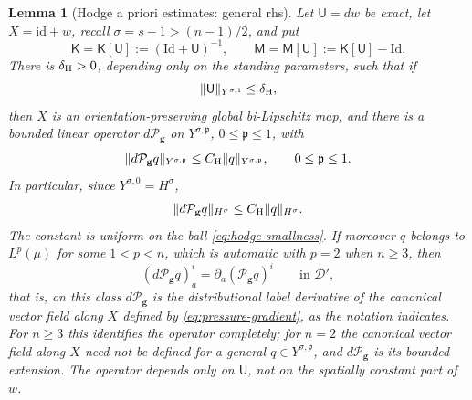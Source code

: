 \documentclass[11pt,reqno]{amsart}
\theoremstyle{plain}
\newtheorem{lemma}[theorem]{Lemma}
\theoremstyle{definition}
\theoremstyle{remark}
\numberwithin{equation}{section}
\newcommand{\preg}{\mathfrak p}
\newcommand{\Ufield}{\mathsf U}
\newcommand{\Kmat}{\mathsf K}
\newcommand{\Mmat}{\mathsf M}
\newcommand{\gmetric}{\mathbf g}
\begin{document}
\begin{lemma}[Hodge a priori estimates: general rhs]\label{lem:label-hodge}
Let $\Ufield=dw$ be exact, let $X=\mathrm{id}+w$, recall $\sigma=s-1>(n-1)/2$,
and put
\begin{equation}\label{eq:KMdef}
    \Kmat=\Kmat[\Ufield]:=(\mathrm{Id}+\Ufield)^{-1},\qquad
    \Mmat=\Mmat[\Ufield]:=\Kmat[\Ufield]-\mathrm{Id}.
\end{equation}
There is $\delta_{\rm H}>0$, depending only on the standing parameters, such that if
\begin{equation}\label{eq:hodge-smallness}
 \|\Ufield\|_{Y^{\sigma,1}}\le\delta_{\rm H},
\end{equation}
then $X$ is an orientation-preserving global bi-Lipschitz map, and there is a
bounded linear operator $d\mathcal P_{\gmetric}$ on $Y^{\sigma,\preg}$,
$0\le\preg\le1$, with
\begin{equation}\label{eq:elliptic-Y}
 \|d\mathcal P_{\gmetric}q\|_{Y^{\sigma,\preg}}
 \le C_{\rm H}\|q\|_{Y^{\sigma,\preg}},
 \qquad 0\le\preg\le1.
\end{equation}
In particular, since $Y^{\sigma,0}=H^\sigma$,
\begin{equation}\label{eq:elliptic-Hsigma}
 \|d\mathcal P_{\gmetric}q\|_{H^\sigma}
 \le C_{\rm H}\|q\|_{H^\sigma}.
\end{equation}
The constant is uniform on the ball \eqref{eq:hodge-smallness}.  If moreover
$q$ belongs to $L^p(\mu)$ for some $1<p<n$, which is automatic with $p=2$ when
$n\ge3$, then
\begin{equation}\label{eq:elliptic-identification}
 (d\mathcal P_{\gmetric}q)_a^i
 =\partial_a(\mathcal P_{\gmetric}q)^i
 \qquad\text{in }\mathcal D',
\end{equation}
that is, on this class $d\mathcal P_{\gmetric}$ is the distributional label
derivative of the canonical vector field along $X$ defined by \eqref{eq:pressure-gradient}, as the
notation indicates.  For $n\ge3$ this identifies the operator completely; for
$n=2$ the canonical vector field along $X$ need not be defined for a general
$q\in Y^{\sigma,\preg}$, and $d\mathcal P_{\gmetric}$ is its bounded extension.
The operator depends only on $\Ufield$, not on the spatially constant part of
$w$.
\end{lemma}
\end{document}
